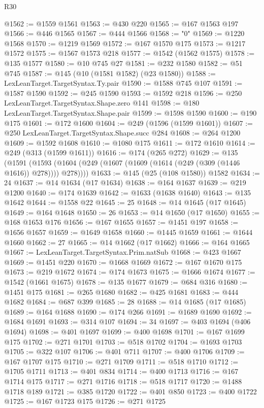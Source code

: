 \begin{lexlean}{R30}
\begin{coremodule}
@1562 := @1559 @1561
@1563 := @430 @220
@1565 := @167 @1563 @197
@1566 := @446 @1565
@1567 := @444 @1566
@1568 := "0"
@1569 := @1220 @1568
@1570 := @1219 @1569
@1572 := @167 @1570 @175
@1573 := @1217 @1572
@1575 := @1567 @1573 @218
@1577 := @1542 (@1562 @1575)
@1578 := @135 @1577
@1580 := @10 @745 @27
@1581 := @232 @1580
@1582 := @51 @745
@1587 := @145 (@10 (@1581 @1582) (@23 @1580))
@1588 := LexLeanTarget.TargetSyntax.Ty.pair
@1590 := @1588 @745 @107
@1591 := @1587 @1590
@1592 := @245 @1590
@1593 := @1592 @218
@1596 := @250 LexLeanTarget.TargetSyntax.Shape.zero @141
@1598 := @180 LexLeanTarget.TargetSyntax.Shape.pair
@1599 := @1598 @1590
@1600 := @190 @175
@1601 := @172 @1600
@1604 := @249 (@1596 (@1599 @1601))
@1607 := @250 LexLeanTarget.TargetSyntax.Shape.succ @284
@1608 := @264 @1200
@1609 := @1592 @1608
@1610 := @1080 @175
@1611 := @172 @1610
@1614 := @249 (@313 (@1599 @1611))
@1616 := @174 (@265 @272)
@1629 := @135
    (@1591 (@1593 (@1604 (@249 (@1607 (@1609 (@1614 (@249 (@309 (@1446 @1616)) @278)))) @278))))
@1633 := @145 (@25 (@108 @1580)) @1582
@1634 := 24
@1637 := @14 @1634 (@17 @1634)
@1638 := @164 @1637
@1639 := @219 @1200
@1640 := @174 @1639
@1642 := @1633 (@1638 @1640)
@1643 := @135 @1642
@1644 := @1558 @22
@1645 := 25
@1648 := @14 @1645 (@17 @1645)
@1649 := @164 @1648
@1650 := 26
@1653 := @14 @1650 (@17 @1650)
@1655 := @168 @1653 @176
@1656 := @167 @1655
@1657 := @1451 @197
@1658 := @1656 @1657
@1659 := @1649 @1658
@1660 := @1445 @1659
@1661 := @1644 @1660
@1662 := 27
@1665 := @14 @1662 (@17 @1662)
@1666 := @164 @1665
@1667 := LexLeanTarget.TargetSyntax.Prim.natSub
@1668 := @423 @1667
@1669 := @1451 @220
@1670 := @1668 @1669
@1672 := @167 @1670 @175
@1673 := @219 @1672
@1674 := @174 @1673
@1675 := @1666 @1674
@1677 := @1542 (@1661 @1675)
@1678 := @135 @1677
@1679 := @684 @316
@1680 := @1451 @175
@1681 := @265 @1680
@1682 := @425 @1681
@1683 := @444 @1682
@1684 := @687 @399
@1685 := 28
@1688 := @14 @1685 (@17 @1685)
@1689 := @164 @1688
@1690 := @174 @266
@1691 := @1689 @1690
@1692 := @1684 @1691
@1693 := @314 @107
@1694 := 34
@1697 := @403 @1694 (@406 @1694)
@1698 := @401 @1697
@1699 := @400 @1698
@1701 := @167 @1699 @175
@1702 := @271 @1701
@1703 := @518 @1702
@1704 := @1693 @1703
@1705 := @322 @107
@1706 := @401 @711
@1707 := @400 @1706
@1709 := @167 @1707 @175
@1710 := @271 @1709
@1711 := @518 @1710
@1712 := @1705 @1711
@1713 := @401 @834
@1714 := @400 @1713
@1716 := @167 @1714 @175
@1717 := @271 @1716
@1718 := @518 @1717
@1720 := @1488 @1718 @189
@1721 := @385 @1720
@1722 := @401 @850
@1723 := @400 @1722
@1725 := @167 @1723 @175
@1726 := @271 @1725

\end{coremodule}
\end{lexlean}
